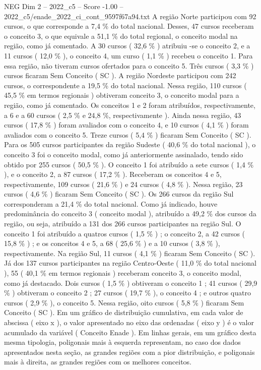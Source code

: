 \begin{textsample}{NEG Dim 2 – 2022\_c5 – Score -1.00 – 2022\_c5/enade\_2022\_ci\_cont\_9597f67a94.txt}
A região Norte participou com 92 cursos, o que corresponde a 7,4 \% do total nacional.
Desses, 47 cursos receberam o conceito 3, o que equivale a 51,1 \% do total regional, o conceito modal na região, como já comentado.
A 30 cursos ( 32,6 \% ) atribuiu -se o conceito 2, e a 11 cursos ( 12,0 \% ), o conceito 4, um curso ( 1,1 \% ) recebeu o conceito 1.
Para essa região, não tiveram cursos ofertados para o conceito 5.
Três cursos ( 3,3 \% ) cursos ficaram Sem Conceito ( SC ).
A região Nordeste participou com 242 cursos, o correspondente a 19,5 \% do total nacional.
Nessa região, 110 cursos ( 45,5 \% em termos regionais ) obtiveram conceito 3, o conceito modal para a região, como já comentado.
Os conceitos 1 e 2 foram atribuídos, respectivamente, a 6 e a 60 cursos ( 2,5 \% e 24,8 \%, respectivamente ).
Ainda nessa região, 43 cursos ( 17,8 \% ) foram avaliados com o conceito 4, e 10 cursos ( 4,1 \% ) foram avaliados com o conceito 5.
Treze cursos ( 5,4 \% ) ficaram Sem Conceito ( SC ).
Para os 505 cursos participantes da região Sudeste ( 40,6 \% do total nacional ), o conceito 3 foi o conceito modal, como já anteriormente assinalado, tendo sido obtido por 255 cursos ( 50,5 \% ).
O conceito 1 foi atribuído a sete cursos ( 1,4 \% ), e o conceito 2, a 87 cursos ( 17,2 \% ).
Receberam os conceitos 4 e 5, respectivamente, 109 cursos ( 21,6 \% ) e 24 cursos ( 4,8 \% ).
Nessa região, 23 cursos ( 4,6 \% ) ficaram Sem Conceito ( SC ).
Os 266 cursos da região Sul corresponderam a 21,4 \% do total nacional.
Como já indicado, houve predominância do conceito 3 ( conceito modal ), atribuído a 49,2 \% dos cursos da região, ou seja, atribuído a 131 dos 266 cursos participantes na região Sul.
O conceito 1 foi atribuído a quatros cursos ( 1,5 \% ) ; o conceito 2, a 42 cursos ( 15,8 \% ) ; e os conceitos 4 e 5, a 68 ( 25,6 \% ) e a 10 cursos ( 3,8 \% ), respectivamente.
Na região Sul, 11 cursos ( 4,1 \% ) ficaram Sem Conceito ( SC ).
Já dos 137 cursos participantes na região Centro-Oeste ( 11,0 \% do total nacional ), 55 ( 40,1 \% em termos regionais ) receberam conceito 3, o conceito modal, como já destacado.
Dois cursos ( 1,5 \% ) obtiveram o conceito 1 ; 41 cursos ( 29,9 \% ) obtiveram o conceito 2 ; 27 cursos ( 19,7 \% ), o conceito 4 ; e outros quatro cursos ( 2,9 \% ), o conceito 5.
Nessa região, oito cursos ( 5,8 \% ) ficaram Sem Conceito ( SC ).
Em um gráfico de distribuição cumulativa, em cada valor de abscissa ( eixo x ), o valor apresentado no eixo das ordenadas ( eixo y ) é o valor acumulado da variável ( Conceito Enade ).
Em linhas gerais, em um gráfico desta mesma tipologia, poligonais mais à esquerda representam, no caso dos dados apresentados nesta seção, as grandes regiões com a pior distribuição, e poligonais mais à direita, as grandes regiões com os melhores conceitos.

\end{textsample}
